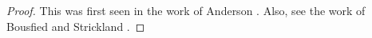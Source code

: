 \documentclass[11pt]{amsart}
\theoremstyle{remark}
\theoremstyle{definition}
\begin{document}
\begin{proof}
	This was first seen in the work of Anderson \cite{Anderson}. Also, see the work of Bousfied and Strickland \cite{Bousfield,Strickland}.
\end{proof}
\end{document}
